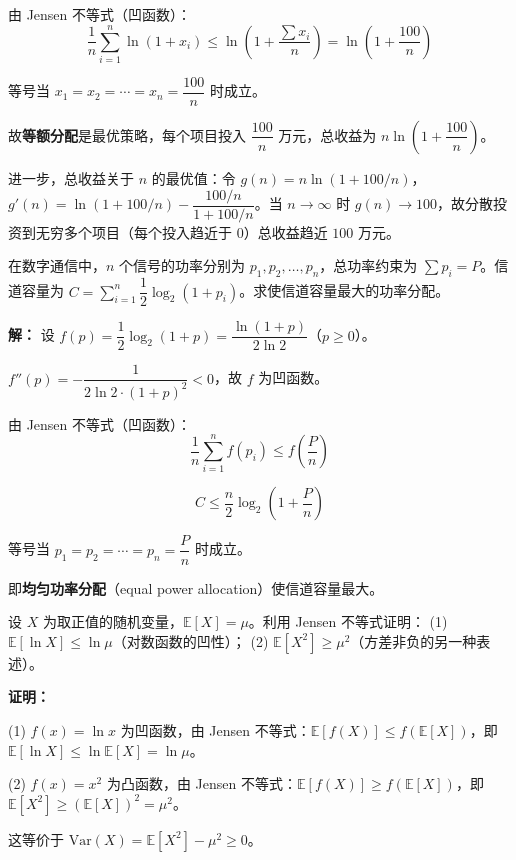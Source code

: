 \documentclass[12pt, a4paper]{ctexart}
\begin{document}
由 Jensen 不等式（凹函数）：
$$\frac{1}{n}\sum_{i=1}^n \ln(1 + x_i) \leq \ln\!\left(1 + \frac{\sum x_i}{n}\right) = \ln\!\left(1 + \frac{100}{n}\right)$$

等号当 $x_1 = x_2 = \cdots = x_n = \dfrac{100}{n}$ 时成立。

故\textbf{等额分配}是最优策略，每个项目投入 $\dfrac{100}{n}$ 万元，总收益为 $n\ln\!\left(1 + \dfrac{100}{n}\right)$。

进一步，总收益关于 $n$ 的最优值：令 $g(n) = n\ln(1 + 100/n)$，$g'(n) = \ln(1 + 100/n) - \dfrac{100/n}{1 + 100/n}$。当 $n \to \infty$ 时 $g(n) \to 100$，故分散投资到无穷多个项目（每个投入趋近于 $0$）总收益趋近 $100$ 万元。

\begin{appbox}[【应用2】信号处理中的凸优化]
在数字通信中，$n$ 个信号的功率分别为 $p_1, p_2, \ldots, p_n$，总功率约束为 $\sum p_i = P$。信道容量为 $C = \sum_{i=1}^n \dfrac{1}{2}\log_2(1 + p_i)$。求使信道容量最大的功率分配。
\end{appbox}

\textbf{解：} 设 $f(p) = \dfrac{1}{2}\log_2(1 + p) = \dfrac{\ln(1 + p)}{2\ln 2}$（$p \geq 0$）。

$f''(p) = -\dfrac{1}{2\ln 2 \cdot (1 + p)^2} < 0$，故 $f$ 为凹函数。

由 Jensen 不等式（凹函数）：
$$\frac{1}{n}\sum_{i=1}^n f(p_i) \leq f\!\left(\frac{P}{n}\right)$$

$$C \leq \frac{n}{2}\log_2\!\left(1 + \frac{P}{n}\right)$$

等号当 $p_1 = p_2 = \cdots = p_n = \dfrac{P}{n}$ 时成立。

即\textbf{均匀功率分配}（equal power allocation）使信道容量最大。

\begin{appbox}
设 $X$ 为取正值的随机变量，$\mathbb{E}[X] = \mu$。利用 Jensen 不等式证明：
(1) $\mathbb{E}[\ln X] \leq \ln \mu$（对数函数的凹性）；
(2) $\mathbb{E}[X^2] \geq \mu^2$（方差非负的另一种表述）。
\end{appbox}

\textbf{证明：}

(1) $f(x) = \ln x$ 为凹函数，由 Jensen 不等式：$\mathbb{E}[f(X)] \leq f(\mathbb{E}[X])$，即 $\mathbb{E}[\ln X] \leq \ln \mathbb{E}[X] = \ln \mu$。

(2) $f(x) = x^2$ 为凸函数，由 Jensen 不等式：$\mathbb{E}[f(X)] \geq f(\mathbb{E}[X])$，即 $\mathbb{E}[X^2] \geq (\mathbb{E}[X])^2 = \mu^2$。

这等价于 $\text{Var}(X) = \mathbb{E}[X^2] - \mu^2 \geq 0$。
\end{document}
